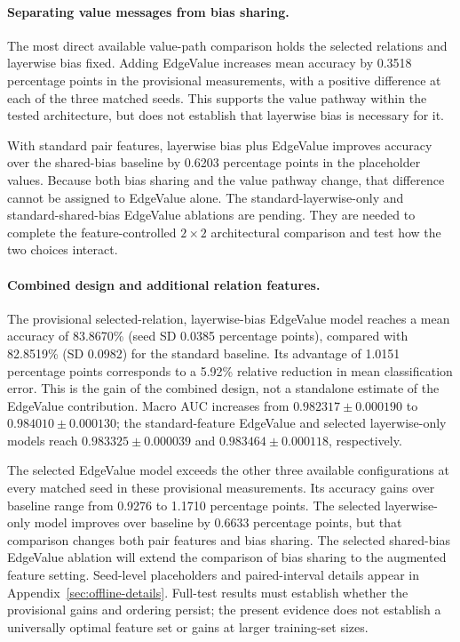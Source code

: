

\paragraph{Separating value messages from bias sharing.}
The most direct available value-path comparison holds the selected
relations and layerwise bias fixed. Adding EdgeValue increases mean
accuracy by 0.3518 percentage points in the provisional measurements,
with a positive difference at each of the three matched seeds. This
supports the value pathway within the tested architecture, but does not
establish that layerwise bias is necessary for it.

With standard pair features, layerwise bias plus EdgeValue improves
accuracy over the shared-bias baseline by 0.6203 percentage points in the
placeholder values. Because both bias sharing and the value pathway
change, that difference cannot be assigned to EdgeValue alone. The
standard-layerwise-only and standard-shared-bias EdgeValue ablations
are pending. They are needed to complete the feature-controlled
$2\times2$ architectural comparison and test how the two choices interact.

\paragraph{Combined design and additional relation features.}
The provisional selected-relation, layerwise-bias EdgeValue model reaches
a mean accuracy of 83.8670\% (seed SD 0.0385 percentage points), compared
with 82.8519\% (SD 0.0982) for the standard baseline. Its advantage of
1.0151 percentage points corresponds to a 5.92\% relative reduction in mean
classification error. This is the gain of the combined design, not a
standalone estimate of the EdgeValue contribution. Macro AUC increases
from $0.982317\pm0.000190$ to $0.984010\pm0.000130$; the standard-feature
EdgeValue and selected layerwise-only models reach
$0.983325\pm0.000039$ and $0.983464\pm0.000118$, respectively.

The selected EdgeValue model exceeds the other three available
configurations at every matched seed in these provisional measurements.
Its accuracy gains over baseline range from 0.9276 to 1.1710 percentage
points. The selected layerwise-only model improves over baseline by
0.6633 percentage points, but that comparison changes both pair features
and bias sharing. The selected shared-bias EdgeValue ablation will extend
the comparison of bias sharing to the augmented feature setting.
Seed-level placeholders and paired-interval details appear in
Appendix~\ref{sec:offline-details}. Full-test results must establish
whether the provisional gains and ordering persist; the present evidence
does not establish a universally optimal feature set or gains at larger
training-set sizes.

